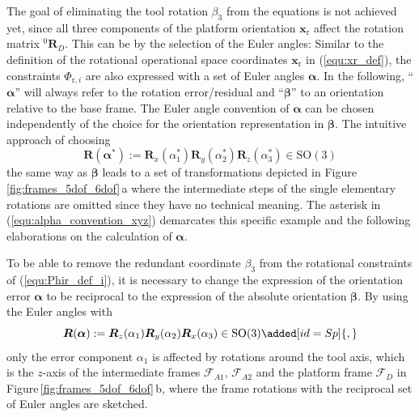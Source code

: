 \documentclass[robotics,article,accept,moreauthors,pdftex]{Definitions/mdpi}
\newcommand{\bm}[1]{\boldsymbol{#1}}
\newcommand{\rotmat}[2]{{{ }^{#1}\boldsymbol{R}}_{#2}}
\newcommand{\ks}[1]{{\mathcal{F}}_{#1}}
\let\Phi\varPhi
\begin{document}
The goal of eliminating the tool rotation $\beta_3$ from the equations is not achieved yet, since all three components of the platform orientation $\bm{x}_\mathrm{r}$ affect the rotation matrix $\rotmat{0}{D}$.
This can be  by the selection of the Euler angles:
Similar to the definition of the rotational operational space coordinates $\bm{x}_\mathrm{r}$ in (\ref{equ:xr_def}), the constraints $\bm{\Phi}_{\mathrm{r},i}$ are also expressed with a set of Euler angles $\bm{\alpha}$.
In the following, ``$\bm{\alpha}$'' will always refer to the rotation error/residual and ``$\bm{\beta}$'' to an orientation relative to the base frame.
The Euler angle convention of $\bm{\alpha}$ can be chosen independently of the choice for the orientation representation in $\bm{\beta}$.
The intuitive approach of choosing
%
\begin{equation}
\bm{R}(\bm{\alpha}^*) := \bm{R}_x(\alpha_1^*) \bm{R}_y(\alpha_2^*) \bm{R}_z(\alpha_3^*) \in \mathrm{SO(3)}
\label{equ:alpha_convention_xyz}
\end{equation}
%
the same way as $\bm{\beta}$ leads to a set of transformations depicted in Figure\,\ref{fig:frames_5dof_6dof}\,a\added[id=Sp]{,} where the intermediate steps of the single elementary rotations are omitted since they have no technical meaning.
The  asterisk in (\ref{equ:alpha_convention_xyz}) demarcates this specific example and the following elaborations on the calculation of $\bm{\alpha}$.

To be able to remove the redundant coordinate $\beta_3$ from the rotational constraints of (\ref{equ:Phir_def_i}), it is necessary to change the expression of the orientation error $\bm{\alpha}$ to be reciprocal to the expression of the absolute orientation $\bm{\beta}$.
By using the Euler angles with
%
\begin{equation}
\bm{R}(\bm{\alpha}) := \bm{R}_z(\alpha_1) \bm{R}_y(\alpha_2) \bm{R}_x(\alpha_3) \in \mathrm{SO(3)}\added[id=Sp]{,}
\label{equ:def_rmat_zyxr}
\end{equation}
%
only the error component $\alpha_1$ is affected by rotations around the tool axis, which is the $z$-axis of the intermediate frames $\ks{A1}$, $\ks{A2}$ and the platform frame $\ks{D}$ in Figure\,\ref{fig:frames_5dof_6dof}\,b, where the frame rotations with the reciprocal set of Euler angles are sketched.
\end{document}
